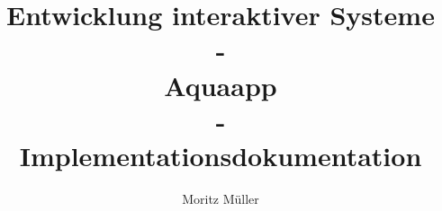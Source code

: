 \documentclass[12pt,a4paper,ngerman]{scrreprt}
\begin{document}
 \title{Entwicklung interaktiver Systeme\\
  -\\
 Aquaapp\\
 -\\
 Implementationsdokumentation}
\author{Moritz Müller}
\maketitle
\tableofcontents







\listoftables \listoffigures
\printbibliography
\appendix
\end{document}
